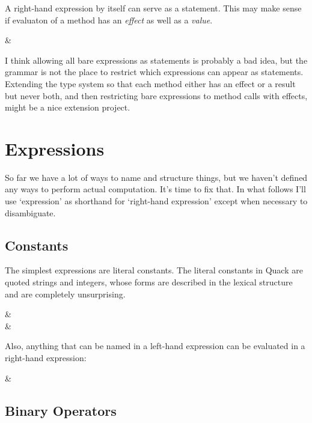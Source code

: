 \documentclass[11pt]{article}
\begin{document}
A right-hand expression by itself can serve as a statement.  This may
make sense if evaluaton of a method  has an \emph{effect} as well
as a \emph{value}.  

\begin{grammar}
 &   \StmtEnd
\end{grammar}

I think allowing all bare expressions as statements is probably a bad
idea, but the grammar is not the place to restrict which expressions
can appear as statements.  Extending the type system so that each 
method either has an effect or a result but never both, and then
restricting bare expressions to method calls with effects, might be a
nice extension project. 

\section{Expressions}

So far we have a lot of  ways to name and structure things, but we haven't
defined any ways to perform actual computation.  It's time to fix that.   In
what follows I'll use `expression' as shorthand for `right-hand
expression' except when necessary to disambiguate. 

\subsection{Constants}

The simplest expressions are literal constants.  The literal constants
in Quack are quoted strings and integers, whose forms are described in
the lexical structure and are completely unsurprising. 

\begin{grammar}
 & \\
 & 
\end{grammar}

Also, anything that can be named in a left-hand expression can be
evaluated in a right-hand expression: 

\begin{grammar}
 & 
\end{grammar}

\subsection{Binary Operators}
\end{document}
